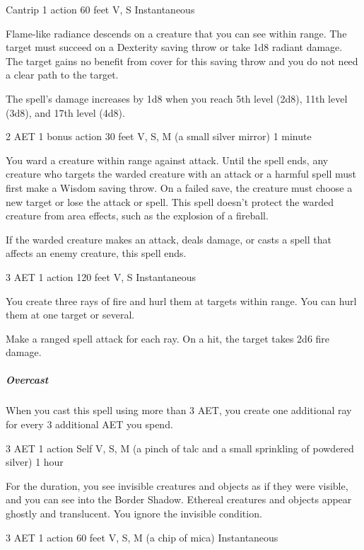 {Cantrip}
{1 action}
{60 feet}
{V, S}
{Instantaneous}

Flame-like radiance descends on a creature that you can see within range. The target must succeed on a Dexterity saving throw or take 1d8 radiant damage. The target gains no benefit from cover for this saving throw and you do not need a clear path to the target.

The spell's damage increases by 1d8 when you reach 5th level (2d8), 11th level (3d8), and 17th level (4d8).


{2 AET}
{1 bonus action}
{30 feet}
{V, S, M (a small silver mirror)}
{1 minute}

You ward a creature within range against attack. Until the spell ends, any creature who targets the warded creature with an attack or a harmful spell must first make a Wisdom saving throw. On a failed save, the creature must choose a new target or lose the attack or spell. This spell doesn't protect the warded creature from area effects, such as the explosion of a fireball.

If the warded creature makes an attack, deals damage, or casts a spell that affects an enemy creature, this spell ends.


{3 AET}
{1 action}
{120 feet}
{V, S}
{Instantaneous}

You create three rays of fire and hurl them at targets within range. You can hurl them at one target or several.

Make a ranged spell attack for each ray. On a hit, the target takes 2d6 fire damage.

\subparagraph*{Overcast} When you cast this spell using more than 3 AET, you create one additional ray for every 3 additional AET you spend.


{3 AET}
{1 action}
{Self}
{V, S, M (a pinch of talc and a small sprinkling of powdered silver)}
{1 hour}

For the duration, you see invisible creatures and objects as if they were visible, and you can see into the Border Shadow. Ethereal creatures and objects appear ghostly and translucent. You ignore the invisible condition.


{3 AET}
{1 action}
{60 feet}
{V, S, M (a chip of mica)}
{Instantaneous}

